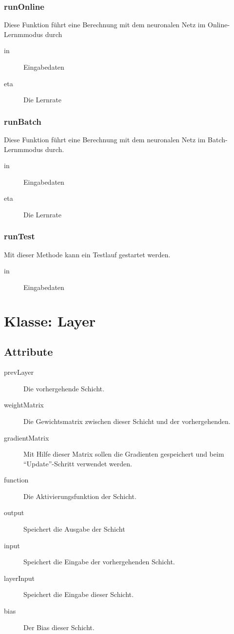 \documentclass[a4paper,10pt]{scrartcl}
\begin{document}
\subsubsection{runOnline}
Diese Funktion führt eine Berechnung mit dem neuronalen Netz im Online-Lernmmodus durch
\begin{description}
\item[in] Eingabedaten
\item[eta] Die Lernrate
\end{description}


\subsubsection{runBatch}
Diese Funktion führt eine Berechnung mit dem neuronalen Netz im Batch-Lernmmodus durch.
\begin{description}
\item[in] Eingabedaten
\item[eta] Die Lernrate
\end{description}


\subsubsection{runTest}
Mit dieser Methode kann ein Testlauf gestartet werden.
\begin{description}
\item[in] Eingabedaten
\end{description}


\section{Klasse: Layer}
\subsection{Attribute}
\begin{description}
\item[prevLayer] Die vorhergehende Schicht.
\item[weightMatrix] Die Gewichtsmatrix zwischen dieser Schicht und der vorhergehenden.
\item[gradientMatrix] Mit Hilfe dieser Matrix sollen die Gradienten gespeichert und beim ``Update''-Schritt verwendet werden.
\item[function] Die Aktivierungsfunktion der Schicht.
\item[output] Speichert die Ausgabe der Schicht
\item[input] Speichert die Eingabe der vorhergehenden Schicht.
\item[layerInput] Speichert die Eingabe dieser Schicht.
\item[bias] Der Bias dieser Schicht.
\end{description}
\end{document}
